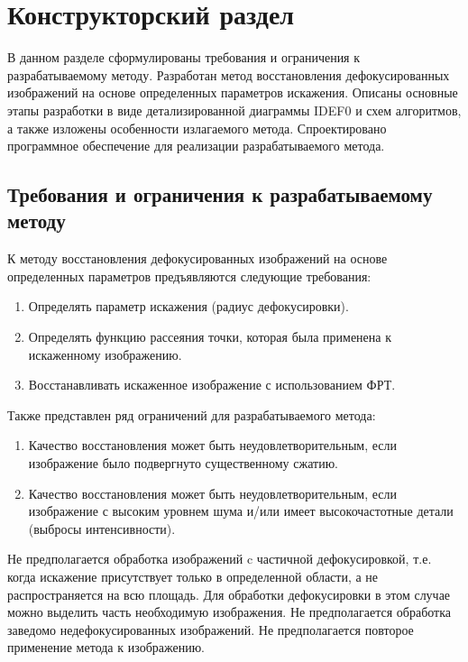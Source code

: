\chapter{Конструкторский раздел}

В данном разделе сформулированы требования и ограничения к разрабатываемому методу. Разработан метод восстановления дефокусированных изображений на основе определенных параметров искажения. Описаны основные этапы разработки в виде детализированной диаграммы IDEF0 и схем алгоритмов, а также изложены особенности излагаемого метода. Спроектировано программное обеспечение для реализации разрабатываемого метода.

\section{Требования и ограничения к разрабатываемому методу}

К методу восстановления дефокусированных изображений на основе определенных параметров предъявляются следующие требования:

\begin{enumerate}
	\item Определять параметр искажения (радиус дефокусировки).
	\item Определять функцию рассеяния точки, которая была применена к искаженному изображению.
	\item Восстанавливать искаженное изображение с использованием ФРТ.
\end{enumerate}

Также представлен ряд ограничений для разрабатываемого метода:

\begin{enumerate}
	\item Качество восстановления может быть неудовлетворительным, если изображение было подвергнуто существенному сжатию.
	\item Качество восстановления может быть неудовлетворительным, если изображение с высоким уровнем шума и/или имеет высокочастотные детали (выбросы интенсивности).
\end{enumerate}

Не предполагается обработка изображений c частичной дефокусировкой, т.е. когда искажение присутствует только в определенной области, а не распространяется на всю площадь. Для обработки дефокусировки в этом случае можно выделить часть необходимую изображения. Не предполагается обработка заведомо недефокусированных изображений. Не предполагается повторое применение метода к изображению.

